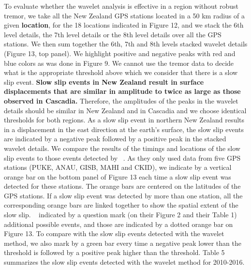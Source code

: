 \documentclass{article}
\begin{document}
To evaluate whether the wavelet analysis is effective in a region without robust tremor, we take all the New Zealand GPS stations located in a 50 km radius of a given \textbf{location}, for the 18 locations indicated in Figure 12, and we stack the 6th level details, the 7th level details or the 8th level details over all the GPS stations. We then sum together the 6th, 7th and 8th levels stacked wavelet details (Figure 13, top panel). We highlight positive and negative peaks with red and blue colors as was done in Figure 9. We cannot use the tremor data to decide what is the appropriate threshold above which we consider that there is a slow slip event. \textbf{Slow slip events in New Zealand result in surface displacements that are similar in amplitude to twice as large as those observed in Cascadia.} Therefore, the amplitudes of the peaks in the wavelet details should be similar in New Zealand and in Cascadia and we choose identical thresholds for both regions. As a slow slip event in northern New Zealand results in a displacement in the east direction at the earth’s surface, the slow slip events are indicated by a negative peak followed by a positive peak in the stacked wavelet details. We compare the results of the timings and locations of the slow slip events to those events detected by ~\citet{TOD_2016}. As they only used data from five GPS stations (PUKE, ANAU, GISB, MAHI and CKID), we indicate by a vertical orange bar on the bottom panel of Figure 13 each time a slow slip event was detected for these stations. The orange bars are centered on the latitudes of the GPS stations. If a slow slip event was detected by more than one station, all the corresponding orange bars are linked together to show the spatial extent of the slow slip. ~\citet{TOD_2016} indicated by a question mark (on their Figure 2 and their Table 1) additional possible events, and those are indicated by a dotted orange bar on Figure 13. To compare with the slow slip events detected with the wavelet method, we also mark by a green bar every time a negative peak lower than the threshold is followed by a positive peak higher than the threshold. Table 5 summarizes the slow slip events detected with the wavelet method for 2010-2016. \\
\end{document}

